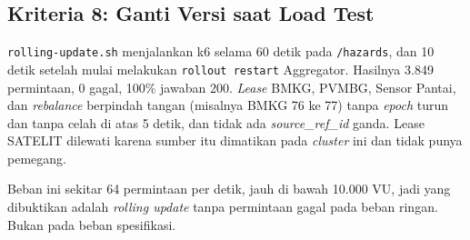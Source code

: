\subsection{Kriteria 8: Ganti Versi saat Load Test}

\texttt{rolling-update.sh} menjalankan k6 selama 60 detik pada \texttt{/hazards}, dan 10 detik setelah mulai melakukan \texttt{rollout restart} Aggregator. Hasilnya 3.849 permintaan, 0 gagal, 100\% jawaban 200. \textit{Lease} BMKG, PVMBG, Sensor Pantai, dan \textit{rebalance} berpindah tangan (misalnya BMKG 76 ke 77) tanpa \textit{epoch} turun dan tanpa celah di atas 5 detik, dan tidak ada \textit{source\_ref\_id} ganda. Lease SATELIT dilewati karena sumber itu dimatikan pada \textit{cluster} ini dan tidak punya pemegang.

Beban ini sekitar 64 permintaan per detik, jauh di bawah 10.000 VU, jadi yang dibuktikan adalah \textit{rolling update} tanpa permintaan gagal pada beban ringan. Bukan pada beban spesifikasi.

